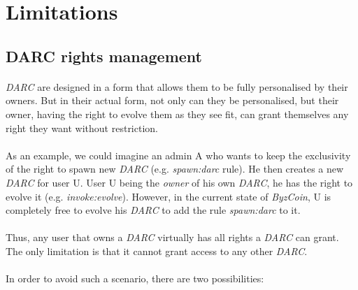 \section{Limitations}

\subsection{DARC rights management}

\paragraph{}

\textit{DARC} are designed in a form that allows them to be fully personalised by their owners. But in their actual form, not only can they be personalised, but their owner, having the right to evolve them as they see fit, can grant themselves any right they want without restriction.

\paragraph{}

As an example, we could imagine an admin A who wants to keep the exclusivity of the right to spawn new \textit{DARC} (e.g. \textit{spawn:darc} rule). He then creates a new \textit{DARC} for user U. User U being the \textit{owner} of his own \textit{DARC}, he has the right to evolve it (e.g. \textit{invoke:evolve}). However, in the current state of \textit{ByzCoin}, U is completely free to evolve his \textit{DARC} to add the rule \textit{spawn:darc} to it.

\paragraph{}

Thus, any user that owns a \textit{DARC} virtually has all rights a \textit{DARC} can grant. The only limitation is that it cannot grant access to any other \textit{DARC}.

\paragraph{}

In order to avoid such a scenario, there are two possibilities:

